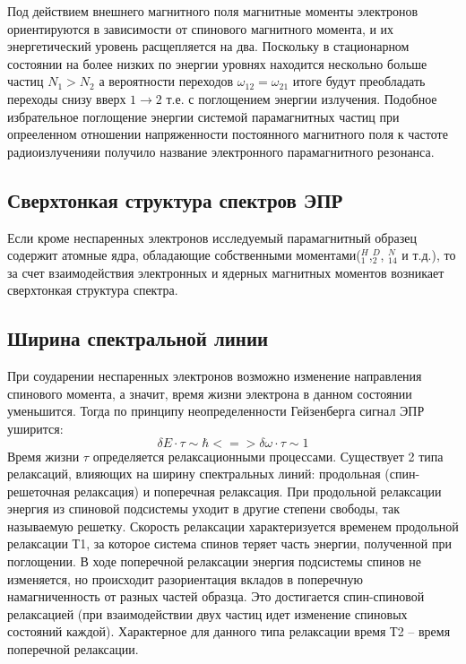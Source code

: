 \documentclass[a4paper,12pt]{article}
\begin{document}
	Под действием внешнего магнитного  поля  магнитные  моменты электронов ориентируются  в зависимости  от    спинового магнитного  момента,  и  их энергетический уровень расщепляется на два. Поскольку в стационарном состоянии на более низких по энергии уровнях находится нескольно больше частиц $N_1>N_2$ а вероятности переходов $\omega_{12}=\omega_{21}$ итоге будут преобладать переходы снизу вверх $1\rightarrow 2$ т.е.  с поглощением энергии излучения. Подобное избрательное поглощение энергии системой парамагнитных частиц при опрееленном отношении напряженности постоянного магнитного поля к частоте радиоизлученияи получило название электронного парамагнитного резонанса.
	
	\subsection{Сверхтонкая структура спектров ЭПР}
	 
	Если кроме неспаренных электронов исследуемый парамагнитный образец содержит атомные ядра, обладающие собственными моментами($_1^H$,$_2^D$, $_14^N$ и т.д.), то за счет взаимодействия электронных и ядерных магнитных моментов возникает сверхтонкая структура спектра.

	\subsection{Ширина спектральной линии}
	
	При соударении неспаренных электронов возможно изменение направления спинового момента, а значит, время жизни электрона в данном состоянии уменьшится. Тогда по принципу неопределенности Гейзенберга сигнал ЭПР уширится:
	\begin{equation}
	\delta E \cdot \tau \sim \hbar <=> \delta \omega \cdot \tau \sim 1
	\end{equation}
Время жизни $\tau$ определяется релаксационными процессами. Существует 2 типа релаксаций, влияющих на ширину спектральных линий: продольная (спин-решеточная релаксация) и поперечная релаксация. При продольной релаксации энергия из спиновой подсистемы уходит в другие степени свободы, так называемую решетку. Скорость релаксации характеризуется временем продольной релаксации Т1, за которое система спинов теряет  часть энергии, полученной при поглощении. В ходе поперечной релаксации энергия подсистемы спинов не изменяется, но происходит разориентация вкладов в поперечную намагниченность от разных частей образца. Это достигается спин-спиновой релаксацией (при взаимодействии двух частиц идет изменение спиновых состояний каждой). Характерное для данного типа релаксации время Т2 – время поперечной релаксации. 
\end{document}
